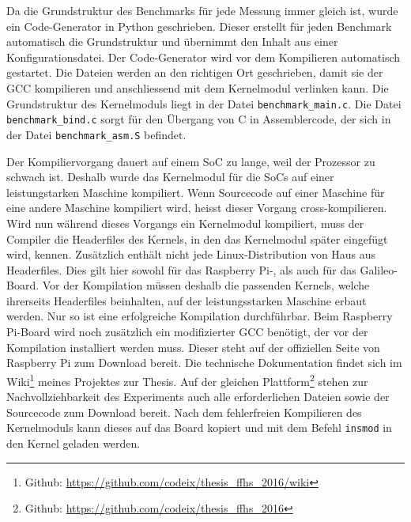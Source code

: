 Da die Grundstruktur des Benchmarks für jede Messung immer gleich ist, wurde ein Code-Generator in Python geschrieben. Dieser erstellt für jeden Benchmark automatisch die Grundstruktur und übernimmt den Inhalt aus einer Konfigurationsdatei. Der Code-Generator wird vor dem Kompilieren automatisch gestartet. Die Dateien werden an den richtigen Ort geschrieben, damit sie der GCC kompilieren und anschliessend mit dem Kernelmodul verlinken kann. Die Grundstruktur des Kernelmoduls liegt in der Datei \texttt{benchmark\_main.c}. Die Datei \texttt{benchmark\_bind.c} sorgt für den Übergang von C in Assemblercode, der sich in der Datei \texttt{benchmark\_asm.S} befindet.
\par
Der Kompiliervorgang dauert auf einem SoC zu lange, weil der Prozessor zu schwach ist. Deshalb wurde das Kernelmodul für die SoCs auf einer leistungstarken Maschine kompiliert. Wenn Sourcecode auf einer Maschine für eine andere Maschine kompiliert wird, heisst dieser Vorgang cross-kompilieren. Wird nun während dieses Vorgangs ein Kernelmodul kompiliert, muss der Compiler die Headerfiles des Kernels, in den das Kernelmodul später eingefügt wird, kennen. Zusätzlich enthält nicht jede Linux-Distribution von Haus aus Headerfiles. Dies gilt hier sowohl für das Raspberry Pi-, als auch für das Galileo-Board. Vor der Kompilation müssen deshalb die passenden Kernels, welche ihrerseits Headerfiles beinhalten, auf der leistungsstarken Maschine erbaut werden. Nur so ist eine erfolgreiche Kompilation durchführbar. Beim Raspberry Pi-Board wird noch zusätzlich ein modifizierter GCC benötigt, der vor der Kompilation installiert werden muss. Dieser steht auf der offiziellen Seite von Raspberry Pi zum Download bereit. Die technische Dokumentation findet sich im Wiki\footnote{Github: \url{https://github.com/codeix/thesis_ffhs_2016/wiki}} meines Projektes zur Thesis. Auf der gleichen Plattform\footnote{Github: \url{https://github.com/codeix/thesis_ffhs_2016}} stehen zur Nachvollziehbarkeit des Experiments auch alle erforderlichen Dateien sowie der Sourcecode zum Download bereit. Nach dem fehlerfreien Kompilieren des Kernelmoduls kann dieses auf das Board kopiert und mit dem Befehl \texttt{insmod} in den Kernel geladen werden.


